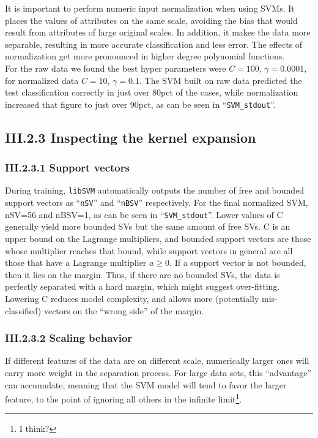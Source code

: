 \documentclass{article}
\theoremstyle{dotless}
\begin{document}
It is important to perform numeric input normalization when using SVMs. It places the values of attributes on the same scale, avoiding the bias that would result from attributes of large original scales.  In addition, it makes the data more separable,  resulting in more accurate classification and less error.  The effects of normalization get more pronounced in higher degree polynomial functions.\\

For the raw data we found the best hyper parameters were $C=100$, $\gamma=0.0001$, for normalized data $C=10$, $\gamma=0.1$. The SVM built on raw data predicted the test classification correctly in just over 80pct of the cases, while normalization increased that figure to just over 90pct, as can be seen in ``\texttt{SVM\_stdout}''.

\subsection{III.2.3 Inspecting the kernel expansion}

\subsubsection{III.2.3.1 Support vectors}

During training, \texttt{libSVM} automatically outputs the number of free and bounded support vectors as ``\texttt{nSV}'' and ``\texttt{nBSV}'' respectively. For the final normalized SVM, nSV=56 and nBSV=1, as can be seen in ``\texttt{SVM\_stdout}''. Lower values of C generally yield more bounded SVs but the same amount of free SVs. C is an upper bound on the Lagrange multipliers, and bounded support vectors are those whose multiplier reaches that bound, while support vectors in general are all those that have a Lagrange multiplier $a\geq 0$. If a support vector is not bounded, then it lies on the margin. Thus, if there are no bounded SVs, the data is perfectly separated with a hard margin, which might suggest over-fitting. Lowering C reduces model complexity, and allows more (potentially mis-classified) vectors on the ``wrong side'' of the margin.

\subsubsection{III.2.3.2 Scaling behavior}

If different features of the data are on different scale, numerically larger ones will carry more weight in the separation process. For large data sets, this ``advantage'' can accumulate, meaning that the SVM model will tend to favor the larger feature, to the point of ignoring all others in the infinite limit\footnote{I think?}.
\end{document}
